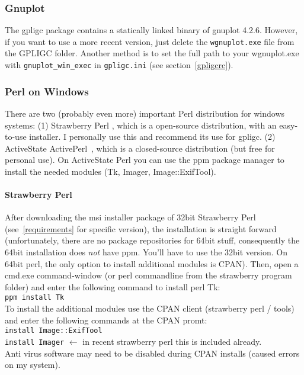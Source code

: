 \subsubsection{Gnuplot}
The gpligc package contains a statically linked binary of gnuplot 4.2.6. 
However, if you want to use a more recent version, just delete the \texttt{wgnuplot.exe} file from the GPLIGC folder.
Another method is to set the full path to your wgnuplot.exe with \texttt{gnuplot\_win\_exec} in \texttt{gpligc.ini} (see section~\ref{gpligcrc}).

\subsubsection{Perl on Windows}
\label{perl}
There are two (probably even more) important Perl distribution for windows systems:
(1) Strawberry Perl \cite{strawberryperl}, which is a open-source distribution, with an easy-to-use installer.
I personally use this and recommend its use for gpligc.
(2) ActiveState ActivePerl~\cite{activeperl}, which is a closed-source distribution (but free for personal use).
On ActiveState Perl you can use the ppm package manager to install the needed modules (Tk, Imager, Image::ExifTool).


\paragraph{Strawberry Perl}
After downloading the msi installer package of 32bit Strawberry Perl (see~\ref{requirements} for specific version),
the installation is straight forward (unfortunately, there are no package repositories for 64bit stuff, consequently the 64bit installation does \emph{not} have ppm. You'll have to use the 32bit version. On 64bit perl, the only option to install additional modules is CPAN).
Then, open a cmd.exe command-window (or perl commandline from the strawberry program folder) and enter the following
command to install perl Tk:\\
\texttt{ppm install Tk}\\
To install the additional modules use the CPAN client (strawberry perl / tools) and enter the following commands
at the CPAN promt:\\
\texttt{install Image::ExifTool}\\
\texttt{install Imager}  $\leftarrow$ in recent strawberry perl this is included already.\\
Anti virus software may need to be disabled during CPAN installs (caused errors on my system).
